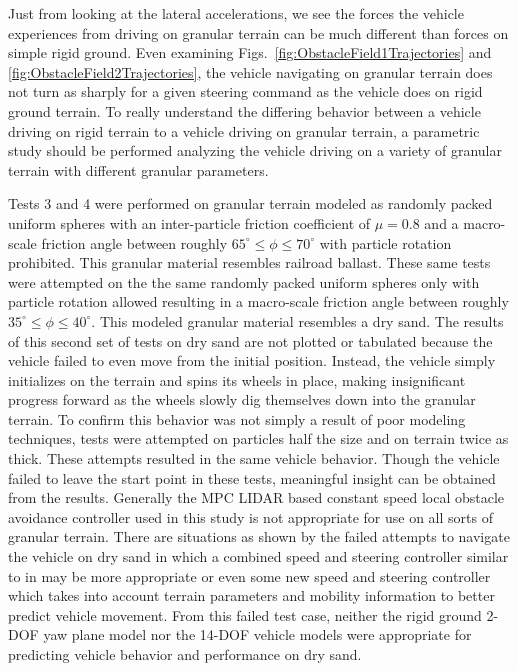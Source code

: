 \documentclass[12pt,twocolumn]{article}
\begin{document}
Just from looking at the lateral accelerations, we see the forces the vehicle experiences from driving on granular terrain can be much different than forces on simple rigid ground. Even examining Figs.~\ref{fig:ObstacleField1Trajectories} and \ref{fig:ObstacleField2Trajectories}, the vehicle navigating on granular terrain does not turn as sharply for a given steering command as the vehicle does on rigid ground terrain. To really understand the differing behavior between a vehicle driving on rigid terrain to a vehicle driving on granular terrain, a parametric study should be performed analyzing the vehicle driving on a variety of granular terrain with different granular parameters. 

Tests 3 and 4 were performed on granular terrain modeled as randomly packed uniform spheres with an inter-particle friction coefficient of $\mu = 0.8$ and a macro-scale friction angle between roughly $65^\circ \leq \phi \leq 70^\circ$ with particle rotation prohibited. This granular material resembles railroad ballast. These same tests were attempted on the the same randomly packed uniform spheres only with particle rotation allowed resulting in a macro-scale friction angle between roughly $35^\circ \leq \phi \leq 40^\circ$. This modeled granular material resembles a dry sand. The results of this second set of tests on dry sand are not plotted or tabulated because the vehicle failed to even move from the initial position. Instead, the vehicle simply initializes on the terrain and spins its wheels in place, making insignificant progress forward as the wheels slowly dig themselves down into the granular terrain. To confirm this behavior was not simply a result of poor modeling techniques, tests were attempted on particles half the size and on terrain twice as thick. These attempts resulted in the same vehicle behavior. Though the vehicle failed to leave the start point in these tests, meaningful insight can be obtained from the results. Generally the MPC LIDAR based constant speed local obstacle avoidance controller used in this study is not appropriate for use on all sorts of granular terrain. There are situations as shown by the failed attempts to navigate the vehicle on dry sand in which a combined speed and steering controller similar to in \cite{SpeedSteer2015} may be more appropriate or even some new speed and steering controller which takes into account terrain parameters and mobility information to better predict vehicle movement. From this failed test case, neither the rigid ground 2-DOF yaw plane model nor the 14-DOF vehicle models were appropriate for predicting vehicle behavior and performance on dry sand.
\end{document}
